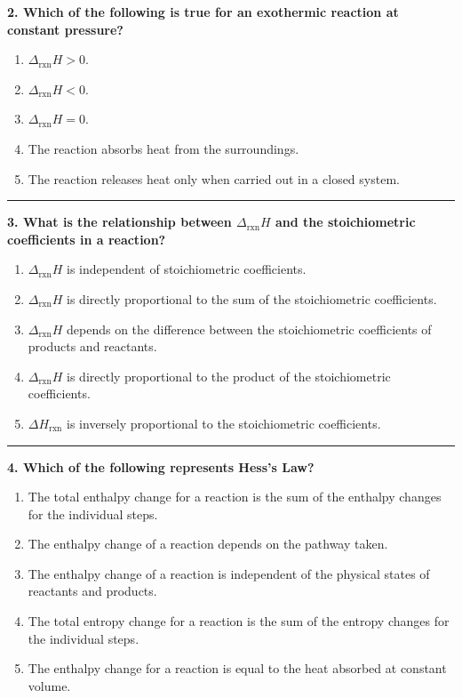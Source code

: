 \documentclass[
  9pt,
]{extbook}
\providecommand{\tightlist}{%
  \setlength{\itemsep}{0pt}\setlength{\parskip}{0pt}}
\theoremstyle{definition}
\theoremstyle{definition}
\theoremstyle{definition}
\theoremstyle{definition}
\theoremstyle{remark}
\begin{document}
\textbf{2. Which of the following is true for an exothermic reaction at constant pressure?}

\begin{enumerate}
\def\labelenumi{\alph{enumi}.}
\tightlist
\item
  \(\Delta_{\text{rxn}} H > 0\).
\item
  \(\Delta_{\text{rxn}} H < 0\).
\item
  \(\Delta_{\text{rxn}} H = 0\).
\item
  The reaction absorbs heat from the surroundings.
\item
  The reaction releases heat only when carried out in a closed system.
\end{enumerate}

\begin{center}\rule{0.5\linewidth}{0.5pt}\end{center}

\textbf{3. What is the relationship between \(\Delta_{\text{rxn}} H\) and the stoichiometric coefficients in a reaction?}

\begin{enumerate}
\def\labelenumi{\alph{enumi}.}
\tightlist
\item
  \(\Delta_{\text{rxn}} H\) is independent of stoichiometric coefficients.
\item
  \(\Delta_{\text{rxn}} H\) is directly proportional to the sum of the stoichiometric coefficients.
\item
  \(\Delta_{\text{rxn}} H\) depends on the difference between the stoichiometric coefficients of products and reactants.
\item
  \(\Delta_{\text{rxn}} H\) is directly proportional to the product of the stoichiometric coefficients.
\item
  \(\Delta H_{\text{rxn}}\) is inversely proportional to the stoichiometric coefficients.
\end{enumerate}

\begin{center}\rule{0.5\linewidth}{0.5pt}\end{center}

\textbf{4. Which of the following represents Hess's Law?}

\begin{enumerate}
\def\labelenumi{\alph{enumi}.}
\tightlist
\item
  The total enthalpy change for a reaction is the sum of the enthalpy changes for the individual steps.
\item
  The enthalpy change of a reaction depends on the pathway taken.
\item
  The enthalpy change of a reaction is independent of the physical states of reactants and products.
\item
  The total entropy change for a reaction is the sum of the entropy changes for the individual steps.
\item
  The enthalpy change for a reaction is equal to the heat absorbed at constant volume.
\end{enumerate}
\end{document}
